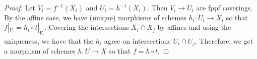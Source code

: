 \begin{proof}
  Let $V_i=f^{-1}(X_i)$ and $U_i=h^{-1}(X_i)$. Then $V_i\to U_i$ are fppf coverings. By
  the affine case, we have (unique) morphisms of schemes $h_i:U_i\to X_i$ so that
  $f|_{V_i}=h_i\circ t|_{V_i}$. Covering the intersections $X_i\cap X_j$ by affines and
  using the uniqueness, we have that the $h_i$ agree on intersections $U_i\cap U_j$.
  Therefore, we get a morphism of schemes $h:U\to X$ so that $f=h\circ t$.
%
 \end{proof}
